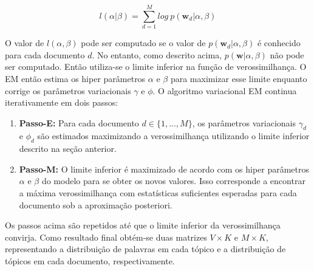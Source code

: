 \documentclass[12pt,a4paper]{article}
\begin{document}
\begin{equation}
l(\alpha|\beta) = \sum_{d=1}^{M} log\ p(\textbf{w}_d|\alpha,\beta)
\end{equation}

O valor de $l(\alpha, \beta)$ pode ser computado se o valor de $p(\textbf{w}_d|\alpha, \beta)$ é conhecido para cada documento $d$. No entanto,
 como descrito acima, $p(\textbf{w}|\alpha,\beta)$ não pode ser computado. Então utiliza-se o limite inferior na função de verossimilhança.
 O EM então estima os hiper parâmetros $\alpha$ e $\beta$ para maximizar esse limite enquanto corrige os parâmetros variacionais $\gamma$ e $\phi$. 
 O algoritmo variacional EM continua iterativamente em dois passos:

\begin{enumerate}
\item \textbf{Passo-E:} Para cada documento $d \in \{1,. . . , M\}$, os parâmetros variacionais $\gamma_d$ e $\phi_d$ são estimados maximizando a verossimilhança utilizando o limite inferior descrito na seção anterior.
\item \textbf{Passo-M:} O limite inferior é maximizado  de acordo com os hiper parâmetros $\alpha$ e $\beta$ do modelo para se obter os novos valores. 
 Isso corresponde a encontrar a máxima verossimilhança com estatísticas suficientes esperadas para cada documento sob a aproximação posteriori.
\end{enumerate}

Os passos acima são repetidos até que o limite inferior da verossimilhança convirja. Como resultado final obtém-se duas matrizes $V \times K$ e $M \times K$,
 representando  a distribuição de palavras em cada tópico e a distribuição de tópicos em cada documento, respectivamente.



\end{document}
